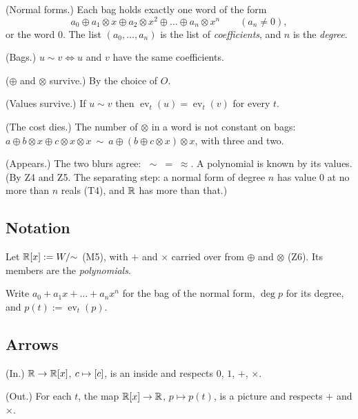 \begin{lines}
\item[\lab{P1}] (Normal forms.) Each bag holds exactly one word of the form
\[
a_0 \oplus a_1 \otimes x \oplus a_2 \otimes x^2 \oplus \dots \oplus a_n \otimes x^n \qquad (a_n \neq 0),
\]
or the word $0$. The list $(a_0, \dots, a_n)$ is the list of \emph{coefficients}, and $n$ is the \emph{degree}.
\item[\lab{P2}] (Bags.) $u \sim v \iff u$ and $v$ have the same coefficients.
\item[\lab{P3.1}] ($\oplus$ and $\otimes$ survive.) By the choice of $O$.
\item[\lab{P3.2}] (Values survive.) If $u \sim v$ then $\operatorname{ev}_t(u) = \operatorname{ev}_t(v)$ for every $t$.
\item[\lab{P4}] (The cost dies.) The number of $\otimes$ in a word is not constant on bags: \\
$a \oplus b \otimes x \oplus c \otimes x \otimes x \ \sim\ a \oplus (b \oplus c \otimes x) \otimes x$, with three and two.
\item[\lab{P5}] (Appears.) The two blurs agree: $\;\sim \;=\; \approx$. A polynomial is known by its values. \\
(By Z4 and Z5. The separating step: a normal form of degree $n$ has value $0$ at no more than $n$ reals (T4), and $\mathbb{R}$ has more than that.)
\end{lines}

\subsection*{Notation}

\begin{lines}
\item[\lab{N1}] Let $\mathbb{R}[x] := W/{\sim}$ (M5), with $+$ and $\times$ carried over from $\oplus$ and $\otimes$ (Z6). Its members are the \emph{polynomials}.
\item[\lab{N2}] Write $a_0 + a_1 x + \dots + a_n x^n$ for the bag of the normal form, $\deg p$ for its degree, and $p(t) := \operatorname{ev}_t(p)$.
\end{lines}

\subsection*{Arrows}

\begin{lines}
\item[\lab{P6}] (In.) $\mathbb{R} \to \mathbb{R}[x]$, $c \mapsto [c]$, is an inside and respects $0$, $1$, $+$, $\times$.
\item[\lab{P7}] (Out.) For each $t$, the map $\mathbb{R}[x] \to \mathbb{R}$, $p \mapsto p(t)$, is a picture and respects $+$ and $\times$.
\end{lines}


